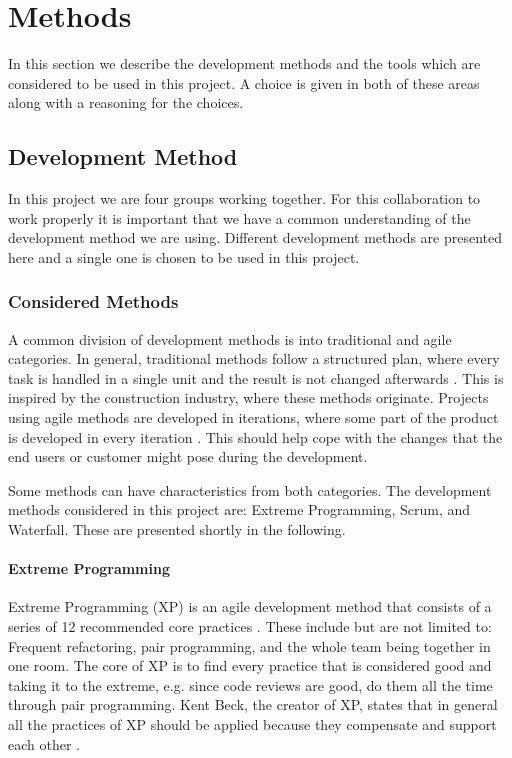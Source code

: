 \section{Methods}
In this section we describe the development methods and the tools which are considered to be used in this project.
A choice is given in both of these areas along with a reasoning for the choices.

\subsection{Development Method}
In this project we are four groups working together.
For this collaboration to work properly it is important that we have a common understanding of the development method we are using.
Different development methods are presented here and a single one is chosen to be used in this project.

\subsubsection{Considered Methods}
A common division of development methods is into traditional and agile categories.
In general, traditional methods follow a structured plan, where every task is handled in a single unit and the result is not changed afterwards \cite[sec.~2.7]{Poppendieck00}.
This is inspired by the construction industry, where these methods originate.
Projects using agile methods are developed in iterations, where some part of the product is developed in every iteration \cite[p.~25]{Larman04}.
This should help cope with the changes that the end users or customer might pose during the development.

Some methods can have characteristics from both categories.
The development methods considered in this project are: Extreme Programming, Scrum, and Waterfall.
These are presented shortly in the following.

\paragraph{Extreme Programming}
Extreme Programming (XP) is an agile development method that consists of a series of 12 recommended core practices \cite[p.~137]{Larman04}.
These include but are not limited to: Frequent refactoring, pair programming, and the whole team being together in one room.
The core of XP is to find every practice that is considered good and taking it to the extreme, e.g. since code reviews are good, do them all the time through pair programming.
Kent Beck, the creator of XP, states that in general all the practices of XP should be applied because they compensate and support each other \cite[p.~156-157]{Larman04}.

